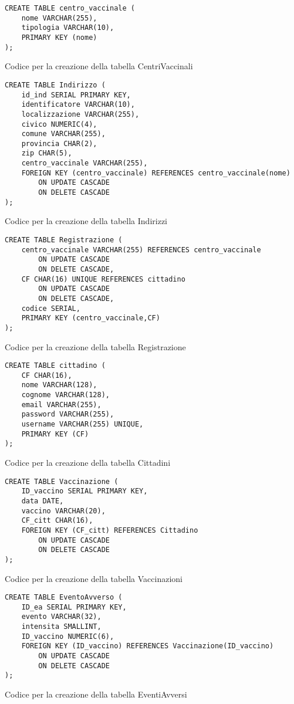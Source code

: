 \begin{listing}[t]
	\begin{verbatim}
CREATE TABLE centro_vaccinale (
	nome VARCHAR(255),
	tipologia VARCHAR(10),
	PRIMARY KEY (nome)
);
	\end{verbatim}
\caption{Codice per la creazione della tabella CentriVaccinali}
\end{listing}

\begin{listing}[t]
	\begin{verbatim}
CREATE TABLE Indirizzo (
	id_ind SERIAL PRIMARY KEY,
	identificatore VARCHAR(10),
	localizzazione VARCHAR(255),
	civico NUMERIC(4),
	comune VARCHAR(255),
	provincia CHAR(2),
	zip CHAR(5),
	centro_vaccinale VARCHAR(255),
	FOREIGN KEY (centro_vaccinale) REFERENCES centro_vaccinale(nome)
		ON UPDATE CASCADE
		ON DELETE CASCADE
);
	\end{verbatim}
\caption{Codice per la creazione della tabella Indirizzi}
\end{listing}

\begin{listing}[t]
	\begin{verbatim}
CREATE TABLE Registrazione (
	centro_vaccinale VARCHAR(255) REFERENCES centro_vaccinale
		ON UPDATE CASCADE
		ON DELETE CASCADE,
	CF CHAR(16) UNIQUE REFERENCES cittadino
		ON UPDATE CASCADE
		ON DELETE CASCADE,
	codice SERIAL,
	PRIMARY KEY (centro_vaccinale,CF)
);
	\end{verbatim}
\caption{Codice per la creazione della tabella Registrazione}
\end{listing}

\begin{listing}[t]
	\begin{verbatim}
CREATE TABLE cittadino (
	CF CHAR(16),
	nome VARCHAR(128),
	cognome VARCHAR(128),
	email VARCHAR(255),
	password VARCHAR(255),
	username VARCHAR(255) UNIQUE,
	PRIMARY KEY (CF)
);
	\end{verbatim}
\caption{Codice per la creazione della tabella Cittadini}
\end{listing}

\begin{listing}[t]
	\begin{verbatim}
CREATE TABLE Vaccinazione (
	ID_vaccino SERIAL PRIMARY KEY,
	data DATE,
	vaccino VARCHAR(20),
	CF_citt CHAR(16),
	FOREIGN KEY (CF_citt) REFERENCES Cittadino
		ON UPDATE CASCADE
		ON DELETE CASCADE
);
	\end{verbatim}
\caption{Codice per la creazione della tabella Vaccinazioni}
\end{listing}

\begin{listing}[t]
	\begin{verbatim}
CREATE TABLE EventoAvverso (
	ID_ea SERIAL PRIMARY KEY,
	evento VARCHAR(32),
	intensita SMALLINT,
	ID_vaccino NUMERIC(6),
	FOREIGN KEY (ID_vaccino) REFERENCES Vaccinazione(ID_vaccino)
		ON UPDATE CASCADE
		ON DELETE CASCADE
);
	\end{verbatim}
\caption{Codice per la creazione della tabella EventiAvversi}
\end{listing}